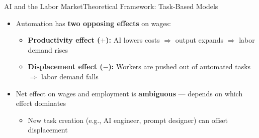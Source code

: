 \documentclass[hyperref={pdfpagelabels=false}]{beamer}
\begin{document}
\begin{frame}{AI and the Labor Market}{Theoretical Framework: Task-Based Models}
	\begin{itemize}
		\item Automation has \textbf{two opposing effects} on wages:
		\vspace{0.2cm}
		\begin{itemize}
			\item \textbf{Productivity effect ($+$):} AI lowers costs $\Rightarrow$ output expands $\Rightarrow$ labor demand rises
			\vspace{0.2cm}
			\item \textbf{Displacement effect ($-$):} Workers are pushed out of automated tasks $\Rightarrow$ labor demand falls
		\end{itemize}
		\vspace{0.2cm}
		\item Net effect on wages and employment is \textbf{ambiguous} --- depends on which effect dominates
		\vspace{0.2cm}
		\begin{itemize}
			\item New task creation (e.g., AI engineer, prompt designer) can offset displacement
		\end{itemize}
	\end{itemize}
\end{frame}
\end{document}
